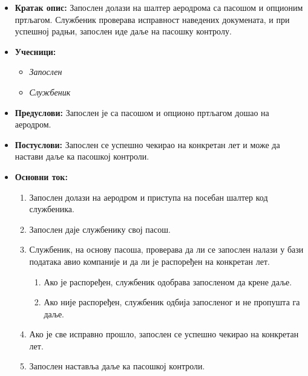 \documentclass{article}
\begin{document}
\begin{itemize}
    \item \textbf{Кратак опис:} Запослен долази на шалтер аеродрома са пасошом и опционим пртљагом. Службеник проверава исправност наведених докумената, и при успешној радњи, запослен иде даље на пасошку контролу.
    \item \textbf{Учесници:}
        \begin{itemize}
            \item \textit{Запослен}
            \item \textit{Службеник}
        \end{itemize}
    \item \textbf{Предуслови:} Запослен је са пасошом и опционо пртљагом дошао на аеродром.
    \item \textbf{Постуслови:} Запослен се успешно чекирао на конкретан лет и може да настави даље ка пасошкој контроли.
    \item \textbf{Основни ток:}
        \begin{enumerate}
            \item Запослен долази на аеродром и приступа на посебан шалтер код службеника.
            \item Запослен даје службенику свој пасош.
            \item Службеник, на основу пасоша, проверава да ли се запослен налази у бази података авио компаније и да ли је распоређен на конкретан лет.
                \begin{enumerate}
                    \item Ако је распоређен, службеник одобрава запосленом да крене даље.
                    \item Ако није распоређен, службеник одбија запосленог и не пропушта га даље.
                \end{enumerate}
            \item Ако је све исправно прошло, запослен се успешно чекирао на конкретан лет.
            \item Запослен наставља даље ка пасошкој контроли.
        \end{enumerate}
\end{itemize}
\end{document}
